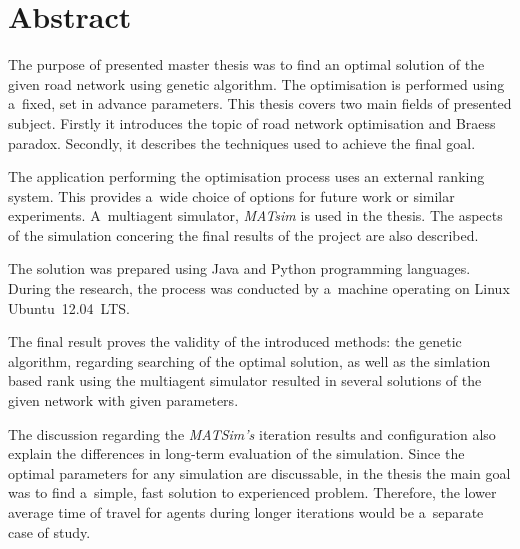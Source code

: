 \documentclass[twoside,12pt]{report}
\let\oldsection\chapter
\def\chapter{\cleardoublepage\oldsection}
\begin{document}
\clearpage
{}
{}
\chapter*{Abstract}

The purpose of presented master thesis was to find an optimal solution of the given road network using genetic algorithm. The optimisation is performed using a~fixed, set in advance parameters. This thesis covers two main fields of presented subject. Firstly it introduces the topic of road network optimisation and Braess paradox. Secondly, it describes the techniques used to achieve the final goal.

The application performing the optimisation process uses an external ranking system. This provides a~wide choice of options for future work or similar experiments. A~multiagent simulator, \textit{MATsim} is used in the thesis. The aspects of the simulation concering the final results of the project are also described. 

The solution was prepared using Java and Python programming languages. During the research, the process was conducted by a~machine operating on Linux Ubuntu~12.04~LTS.

The final result proves the validity of the introduced methods: the genetic algorithm, regarding searching of the optimal solution, as well as the simlation based rank using the multiagent  simulator resulted in several solutions of the given network with given parameters.

The discussion regarding the \textit{MATSim's} iteration results and configuration also explain the differences in long-term evaluation of the simulation. Since the optimal parameters for any simulation are discussable, in the thesis the main goal was to find a~simple, fast solution to experienced problem. Therefore, the lower average time of travel for agents during longer iterations would be a~separate case of study.

\clearpage
\thispagestyle{empty}
\mbox{}

%

\clearpage

%
\end{document}

